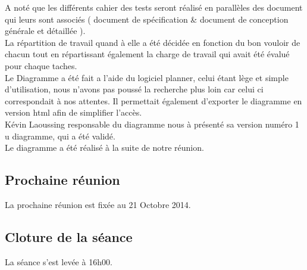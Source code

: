 \documentclass{article}
\begin{document}
A noté que les différents cahier des tests seront réalisé en parallèles des document qui leurs sont associés ( document de spécification \& document de conception générale et détaillée ).\\

La répartition de travail quand à elle a été décidée en fonction du bon vouloir de chacun tout en répartissant également la charge de travail qui avait été évalué pour chaque taches.\\

Le Diagramme a été fait a l'aide du logiciel planner, celui étant lège et simple d'utilisation, nous n'avons pas poussé la recherche plus loin car celui ci correspondait à nos attentes.
Il permettait également d'exporter le diagramme en version html afin de simplifier l'accès.\\

Kévin Laoussing responsable du diagramme nous à présenté sa version numéro 1 u diagramme, qui a été validé.\\
Le diagramme a été réalisé à la suite de notre réunion.

\subsection{Prochaine réunion}

La prochaine réunion est fixée au 21 Octobre 2014.\\

\subsection{Cloture de la séance}

La séance s'est levée à 16h00. \\
\end{document}
